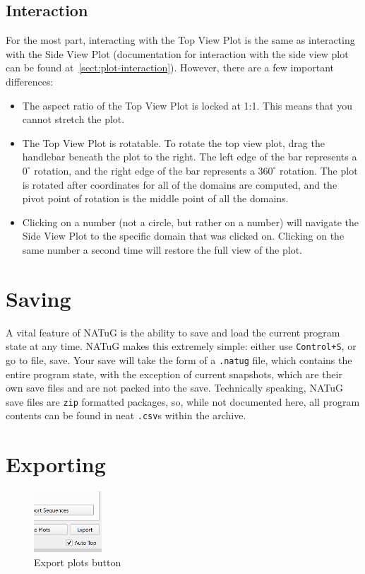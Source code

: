 \documentclass[titlepage]{article}
\begin{document}
\subsection{Interaction}
For the most part, interacting with the Top View Plot is the same as interacting with the Side View Plot (documentation for interaction with the side view plot can be found at~\ref{sect:plot-interaction}). However, there are a few important differences:
\begin{itemize}
	\item The aspect ratio of the Top View Plot is locked at 1:1. This means that you cannot stretch the plot.
	\item The Top View Plot is rotatable. To rotate the top view plot, drag the handlebar beneath the plot to the right. The left edge of the bar represents a $0^{\circ}$ rotation, and the right edge of the bar represents a $360^{\circ}$ rotation. The plot is rotated after coordinates for all of the domains are computed, and the pivot point of rotation is the middle point of all the domains.
	\item Clicking on a number (not a circle, but rather on a number) will navigate the Side View Plot to the specific domain that was clicked on. Clicking on the same number a second time will restore the full view of the plot.
\end{itemize}

\section{Saving}

A vital feature of NATuG is the ability to save and load the current program state at any time. NATuG makes this extremely simple: either use \texttt{Control+S}, or go to file, save. Your save will take the form of a \texttt{.natug} file, which contains the entire program state, with the exception of current snapshots, which are their own save files and are not packed into the save. Technically speaking, NATuG save files are \texttt{zip} formatted packages, so, while not documented here, all program contents can be found in neat \texttt{.csv}s within the archive.

\section{Exporting}

\begin{figure} \label{export-plots-button}
	\centering
	\caption{Export plots button}
	\includegraphics[width=1in]{export-plots-button.png}
\end{figure}
\end{document}
